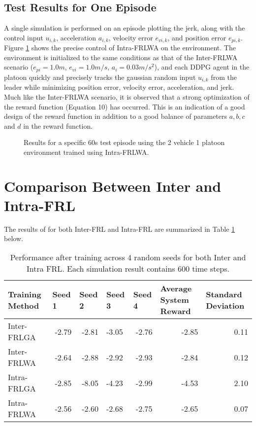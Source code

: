 \subsection{Test Results for One Episode}
A single simulation is performed on an episode plotting the jerk, along with the control
input $u_{i,k}$, acceleration $a_{i,k}$, velocity error $e_{vi,k}$, and position
error $e_{pi,k}$.  Figure \ref{fig:intraFRL-simresult} shows the precise control of
Intra-FRLWA on the environment.  The environment is initialized to the same conditions
as that of the Inter-FRLWA scenario
($e_{pi} = 1.0 m$, $e_{vi}=1.0 m/s$, $a_i = 0.03 m/s^2$), and each DDPG agent in the
platoon quickly and precisely tracks the gaussian random input $u_{i,k}$ from the
leader while minimizing position error, velocity error, acceleration, and jerk.  Much
like the Inter-FRLWA scenario, it is observed that a strong optimization of the reward
function (Equation 10) has occurred.  This is an indication of a good design of the
reward function in addition to a good balance of parameters $a,b,c$ and $d$ in the
reward function.

\begin{figure}[H]
    \centering
    
    \caption{Results for a specific 60s test episode using the 2 vehicle 1 platoon
    environment trained using Intra-FRLWA.}
    \label{fig:intraFRL-simresult}
\end{figure}

\section{Comparison Between Inter and Intra-FRL}
The results of for both Inter-FRL and Intra-FRL are summarized in Table \ref{tab:inter_vs_intra} below.

\begin{table}[H]
    \centering
    \scriptsize
    \caption{Performance after training across 4 random seeds for both Inter and Intra FRL. Each simulation result contains 600 time steps.}
    \begin{tabular}{lrrlrrr} \toprule
    \textbf{Training Method} & \multicolumn{1}{l}{\textbf{Seed 1}} & \multicolumn{1}{l}{\textbf{Seed 2}} & \multicolumn{1}{l}{\textbf{Seed 3}} & \multicolumn{1}{l}{\textbf{Seed 4}} & \multicolumn{1}{l}{\textbf{Average System Reward}} & \multicolumn{1}{l}{\textbf{Standard Deviation}} \\ \midrule
        Inter-FRLGA & -2.79 & -2.81 & -3.05 & -2.76 & -2.85 & 0.11 \\
        Inter-FRLWA & -2.64 & -2.88 & -2.92 & -2.93 & -2.84 & 0.12 \\
        Intra-FRLGA & -2.85 & -8.05 & -4.23 & -2.99 & -4.53 & 2.10 \\
        Intra-FRLWA & -2.56 & -2.60 & -2.68 & -2.75 & -2.65 & 0.07 \\ \bottomrule
    \end{tabular}
    \label{tab:inter_vs_intra}
\end{table}

